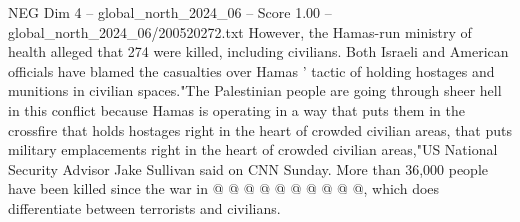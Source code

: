 \begin{textsample}{NEG Dim 4 – global\_north\_2024\_06 – Score 1.00 – global\_north\_2024\_06/200520272.txt}
However, the Hamas-run ministry of health alleged that 274 were killed, including civilians.
Both Israeli and American officials have blamed the casualties over Hamas ' tactic of holding hostages and munitions in civilian spaces."The Palestinian people are going through sheer hell in this conflict because Hamas is operating in a way that puts them in the crossfire that holds hostages right in the heart of crowded civilian areas, that puts military emplacements right in the heart of crowded civilian areas,"US National Security Advisor Jake Sullivan said on CNN Sunday.
More than 36,000 people have been killed since the war in @ @ @ @ @ @ @ @ @ @, which does differentiate between terrorists and civilians.

\end{textsample}
